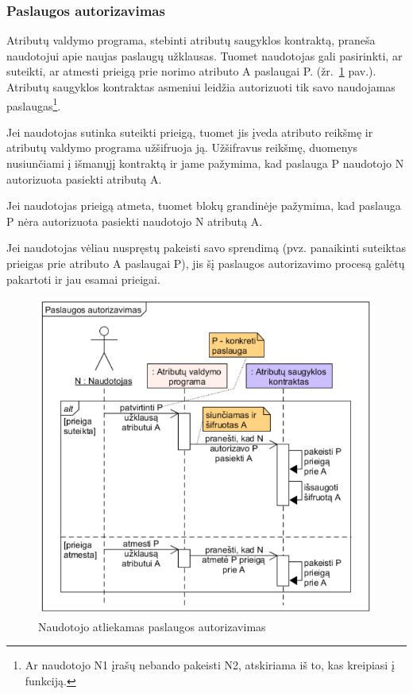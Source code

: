 \subsubsection{Paslaugos autorizavimas}

Atributų valdymo programa, stebinti atributų saugyklos kontraktą, praneša naudotojui apie naujas
paslaugų užklausas. Tuomet naudotojas gali pasirinkti, ar suteikti, ar atmesti prieigą prie norimo atributo
A paslaugai P. (žr.\hypertarget{fig:givePermissions}{~\ref{fig:givePermissions} pav.}). Atributų saugyklos kontraktas
asmeniui leidžia autorizuoti tik savo naudojamas paslaugas\footnote{ Ar naudotojo N1 įrašų nebando pakeisti N2, atskiriama iš
to, kas kreipiasi į funkciją.}.

Jei naudotojas sutinka suteikti prieigą, tuomet jis įveda atributo reikšmę ir atributų valdymo programa užšifruoja ją.
Užšifravus reikšmę, duomenys nusiunčiami į išmanųjį kontraktą ir jame pažymima, kad paslauga P naudotojo N autorizuota
pasiekti atributą A.

Jei naudotojas prieigą atmeta, tuomet blokų grandinėje pažymima, kad paslauga P nėra autorizuota pasiekti naudotojo N atributą A.

Jei naudotojas vėliau nuspręstų pakeisti savo sprendimą (pvz. panaikinti suteiktas prieigas prie atributo A paslaugai P),
jis šį paslaugos autorizavimo procesą galėtų pakartoti ir jau esamai prieigai.


\begin{figure}[h]
    \centering
    \includegraphics[scale=0.8]{img/givePermissions}
    \caption{Naudotojo atliekamas paslaugos autorizavimas}
    \label{fig:givePermissions}
\end{figure}

